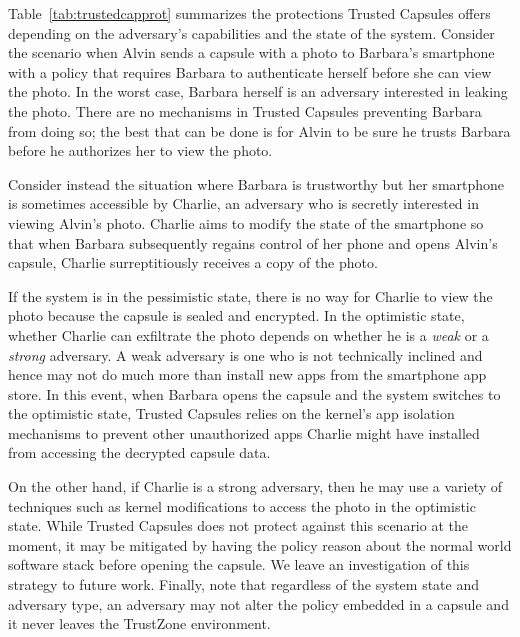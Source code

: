 Table~\ref{tab:trustedcapprot} summarizes the protections Trusted Capsules
offers depending on the adversary's capabilities and the state of the
system. Consider the scenario when Alvin sends a capsule with a photo to
Barbara's smartphone with a policy that requires Barbara to authenticate herself
before she can view the photo. In the worst case, Barbara herself is an
adversary interested in leaking the photo. There are no mechanisms in Trusted
Capsules preventing Barbara from doing so; the best that can be done is for Alvin to
be sure he trusts Barbara before he authorizes her to view the photo.

Consider instead the situation where Barbara is trustworthy but her smartphone
is sometimes accessible by Charlie, an adversary who is secretly interested in
viewing Alvin's photo. Charlie aims to modify the state of the smartphone so
that when Barbara subsequently regains control of her phone and opens Alvin's
capsule, Charlie surreptitiously receives a copy of the photo.

If the system is in the pessimistic state, there is no way for Charlie to view
the photo because the capsule is sealed and encrypted. In the optimistic state,
whether Charlie can exfiltrate the photo depends on whether he is a {\em weak}
or a {\em strong} adversary. A weak adversary is one who is not technically
inclined and hence may not do much more than install new apps from the
smartphone app store. In this event, when Barbara opens the capsule and the
system switches to the optimistic state, Trusted Capsules relies on the kernel's
app isolation mechanisms to prevent other unauthorized apps Charlie might have
installed from accessing the decrypted capsule data.

On the other hand, if Charlie is a strong adversary, then he may use a variety of
techniques such as kernel modifications to access the photo in the optimistic
state. While Trusted Capsules does not protect against this scenario at the
moment, it may be mitigated by having the policy reason about the normal world
software stack before opening the capsule. We leave an investigation of this
strategy to future work. Finally, note that regardless of the system state and
adversary type, an adversary may not alter the policy embedded in a capsule and
it never leaves the TrustZone environment.

%
